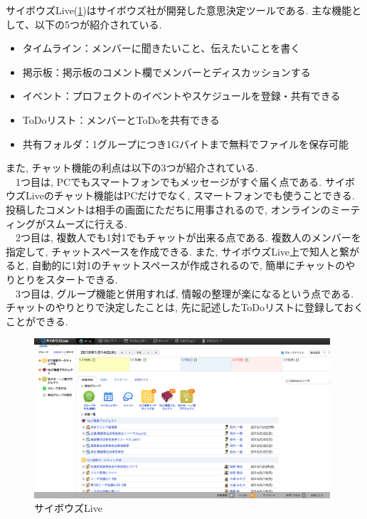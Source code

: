 \documentclass{funthesis}
\begin{document}

サイボウズLive(\ref{cybozu})はサイボウズ社が開発した意思決定ツールである. 
主な機能として、以下の5つが紹介されている.
\begin{itemize}
 \item タイムライン：メンバーに聞きたいこと、伝えたいことを書く
 \item 掲示板：掲示板のコメント欄でメンバーとディスカッションする
 \item イベント：プロフェクトのイベントやスケジュールを登録・共有できる
 \item ToDoリスト：メンバーとToDoを共有できる
 \item 共有フォルダ：1グループにつき1Gバイトまで無料でファイルを保存可能
\end{itemize}
また, チャット機能の利点は以下の3つが紹介されている.\\
　1つ目は, PCでもスマートフォンでもメッセージがすぐ届く点である. サイボウズLiveのチャット機能はPCだけでなく, スマートフォンでも使うことできる. 投稿したコメントは相手の画面にただちに用事されるので, オンラインのミーティングがスムーズに行える. \\
　2つ目は,  複数人でも1対1でもチャットが出来る点である. 複数人のメンバーを指定して, チャットスペースを作成できる. また, サイボウズLive上で知人と繋がると, 自動的に1対1のチャットスペースが作成されるので, 簡単にチャットのやりとりをスタートできる. \\
　3つ目は,  グループ機能と併用すれば, 情報の整理が楽になるという点である. チャットのやりとりで決定したことは, 先に記述したToDoリストに登録しておくことができる. \\
\begin{figure}[H]
 \begin{center}
  \includegraphics[width=110mm]{./img/cybozulive.png}
 \end{center}
 \caption{サイボウズLive}
 \label{cybozu}
\end{figure}
\end{document}
